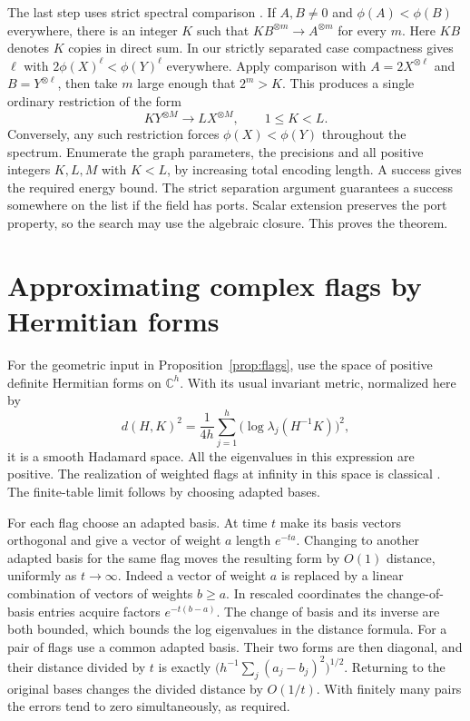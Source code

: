 \documentclass[11pt]{article}
\theoremstyle{definition}
\newcommand{\res}{\longrightarrow}
\begin{document}
The last step uses strict spectral comparison \cite{strassen-spectrum,euclid}.
If \(A,B\ne0\) and \(\phi(A)<\phi(B)\) everywhere, there is an integer
\(K\) such that \(K B^{\otimes m}\res A^{\otimes m}\) for every \(m\).
Here \(K B\) denotes \(K\) copies in direct sum. In our strictly separated
case compactness gives \(\ell\) with \(2\phi(X)^\ell<\phi(Y)^\ell\)
everywhere. Apply comparison with \(A=2X^{\otimes\ell}\) and
\(B=Y^{\otimes\ell}\), then take \(m\) large enough that \(2^m>K\).
This produces a single ordinary restriction of the form
\[
                  K Y^{\otimes M}\res L X^{\otimes M},
                  \qquad 1\le K<L .
\]
Conversely, any such restriction forces \(\phi(X)<\phi(Y)\) throughout
the spectrum. Enumerate the graph parameters, the precisions and all
positive integers \(K,L,M\) with \(K<L\), by increasing total encoding
length. A success gives the required energy bound. The strict separation
argument guarantees a success somewhere on the list if the field has
ports. Scalar extension preserves the port property, so the search may
use the algebraic closure. This proves the theorem.

\section{Approximating complex flags by Hermitian forms}
\label{app:hermitian}

For the geometric input in Proposition~\ref{prop:flags}, use the space of
positive definite Hermitian forms on \(\mathbb C^h\). With its usual
invariant metric, normalized here by
\[
  d(H,K)^2=\frac{1}{4h}\sum_{j=1}^h
                 \bigl(\log\lambda_j(H^{-1}K)\bigr)^2 ,
\]
it is a smooth Hadamard space. All the eigenvalues in this expression are
positive. The realization of weighted flags at infinity in this space
is classical \cite{cornut}. The finite-table limit follows by choosing
adapted bases.

For each flag choose an adapted basis. At time \(t\) make its basis
vectors orthogonal and give a vector of weight \(a\) length \(e^{-ta}\).
Changing to another adapted basis for the same flag moves the resulting
form by \(O(1)\) distance, uniformly as \(t\to\infty\). Indeed a vector
of weight \(a\) is replaced by a linear combination of vectors of weights
\(b\ge a\). In rescaled coordinates the change-of-basis entries acquire
factors \(e^{-t(b-a)}\). The change of basis and its inverse are both
bounded, which bounds the log eigenvalues in the distance formula.
For a pair of flags use a common adapted basis. Their two forms are then
diagonal, and their distance divided by \(t\) is exactly
\(\big(h^{-1}\sum_j(a_j-b_j)^2\big)^{1/2}\). Returning to the original
bases changes the divided distance by \(O(1/t)\). With finitely many
pairs the errors tend to zero simultaneously, as required.

\begingroup\small


\endgroup
\end{document}
